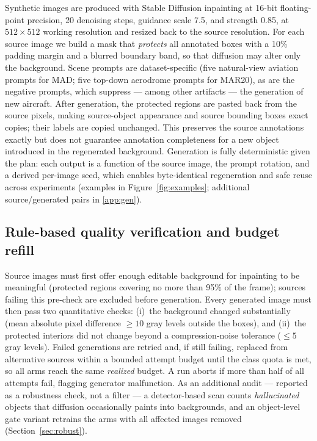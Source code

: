 \documentclass[preprint,12pt,authoryear]{elsarticle}
\begin{document}
Synthetic images are produced with Stable Diffusion inpainting
\citep[\texttt{runwayml/stable-diffusion-inpainting};][]{rombach2022ldm}
at 16-bit floating-point precision, 20 denoising steps, guidance scale
7.5, and strength 0.85, at $512\times512$ working resolution and resized
back to the source resolution. For each source image we build a mask
that \emph{protects} all annotated boxes with a 10\% padding margin and
a blurred boundary band, so that diffusion may alter only the
background. Scene prompts are dataset-specific (five natural-view
aviation prompts for MAD; five top-down aerodrome prompts for MAR20), as
are the negative prompts, which suppress --- among other artifacts ---
the generation of new aircraft. After generation, the protected regions
are pasted back from the source pixels, making source-object appearance
and source bounding boxes exact copies; their labels are copied
unchanged. This preserves the source annotations exactly but does not
guarantee annotation completeness for a new object introduced in the
regenerated background.
Generation is fully deterministic given the plan: each output is a
function of the source image, the prompt rotation, and a derived
per-image seed, which enables byte-identical regeneration and safe reuse
across experiments (examples in Figure~\ref{fig:examples}; additional
source/generated pairs in \ref{app:gen}).

\subsection{Rule-based quality verification and budget refill}\label{sec:verify}

Source images must first offer enough editable background for inpainting
to be meaningful (protected regions covering no more than 95\% of the
frame); sources failing this pre-check are excluded before generation.
Every generated image must then pass two quantitative checks: (i)~the
background changed substantially (mean absolute pixel difference $\geq
10$ gray levels outside the boxes), and (ii)~the protected interiors did
not change beyond a compression-noise tolerance ($\leq 5$ gray levels).
Failed generations are retried and, if still failing, replaced from
alternative sources within a bounded attempt budget until the class
quota is met, so all arms reach the same \emph{realized} budget. A run
aborts if more than half of all attempts fail, flagging generator
malfunction. As an additional audit --- reported as a robustness check,
not a filter --- a detector-based scan counts \emph{hallucinated}
objects that diffusion occasionally paints into backgrounds, and an
object-level gate variant retrains the arms with all affected images
removed (Section~\ref{sec:robust}).
\end{document}
